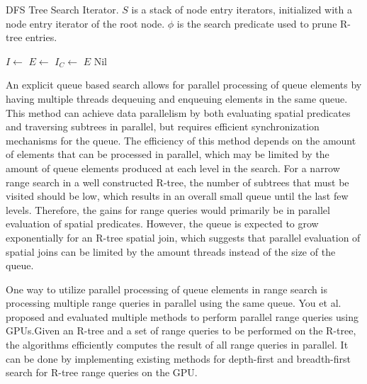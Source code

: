 \begin{algorithm}
  \caption{DFS Tree Search Iterator. \(S\) is a stack of node entry iterators, initialized with a node entry iterator of the root node. \(\phi\) is the search predicate used to prune R-tree entries. }
  \label{alg-tree-search-iterator}
  \begin{algorithmic}[1]
        \State \(I \leftarrow\) 
        \State \(E \leftarrow\) 
          \State {}
        \Else
            \State \(I_C \leftarrow\) 
            \State {}
          \Else
            \State \Return \(E\)
          \EndIf
        \EndIf
      \EndWhile
      \State \Return Nil
    \EndFunction
  \end{algorithmic}
\end{algorithm}

An explicit queue based search allows for parallel processing of queue elements by having multiple threads dequeuing and enqueuing elements in the same queue. This method can achieve data parallelism by both evaluating spatial predicates and traversing subtrees in parallel, but requires efficient synchronization mechanisms for the queue. The efficiency of this method depends on the amount of elements that can be processed in parallel, which may be limited by the amount of queue elements produced at each level in the search. For a narrow range search in a well constructed R-tree, the number of subtrees that must be visited should be low, which results in an overall small queue until the last few levels. Therefore, the gains for range queries would primarily be in parallel evaluation of spatial predicates. However, the queue is expected to grow exponentially for an R-tree spatial join, which suggests that parallel evaluation of spatial joins can be limited by the amount threads instead of the size of the queue.

One way to utilize parallel processing of queue elements in range search is processing multiple range queries in parallel using the same queue. You et al.~\cite{you2013parallel} proposed and evaluated multiple methods to perform parallel range queries using GPUs.\@ Given an R-tree and a set of range queries to be performed on the R-tree, the algorithms efficiently computes the result of all range queries in parallel. It can be done by implementing existing methods for depth-first and breadth-first search for R-tree range queries on the GPU.\@

